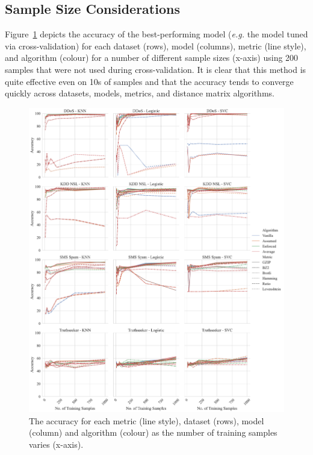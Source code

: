 \documentclass[conference]{IEEEtran}
\begin{document}
\subsection{Sample Size Considerations}
Figure~\ref{fig:sample_size} depicts the accuracy of the best-performing model (\textit{e.g.} the model tuned via cross-validation) for each dataset (rows), model (columns), metric (line style), and algorithm (colour) for a number of different sample sizes (x-axis) using 200 samples that were not used during cross-validation. 
It is clear that this method is quite effective even on 10s of samples and that the accuracy tends to converge quickly across datasets, models, metrics, and distance matrix algorithms. 
\begin{figure}
    \centering
    \includegraphics[width=\textwidth]{images/accuracy_vs_train_size.pdf}
    \caption{The accuracy for each metric (line style), dataset (rows), model (column) and algorithm (colour) as the number of training samples varies (x-axis).}
    \label{fig:sample_size}
\end{figure}
\end{document}
